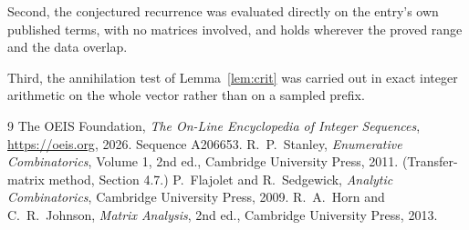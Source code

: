 \documentclass[11pt,a4paper]{article}
\theoremstyle{plain}
\theoremstyle{definition}
\begin{document}
Second, the conjectured recurrence was evaluated directly on the entry's own published terms,
with no matrices involved, and holds wherever the proved range and the data overlap.

Third, the annihilation test of Lemma~\ref{lem:crit} was carried out in exact integer
arithmetic on the whole vector rather than on a sampled prefix.

\begin{thebibliography}{9}
 The OEIS Foundation, \emph{The On-Line Encyclopedia of Integer
Sequences}, \url{https://oeis.org}, 2026. Sequence A206653.
 R.~P.~Stanley, \emph{Enumerative Combinatorics}, Volume 1, 2nd ed.,
Cambridge University Press, 2011. (Transfer-matrix method, Section 4.7.)
 P.~Flajolet and R.~Sedgewick, \emph{Analytic Combinatorics}, Cambridge
University Press, 2009.
 R.~A.~Horn and C.~R.~Johnson, \emph{Matrix Analysis}, 2nd ed., Cambridge
University Press, 2013.
\end{thebibliography}
\end{document}
